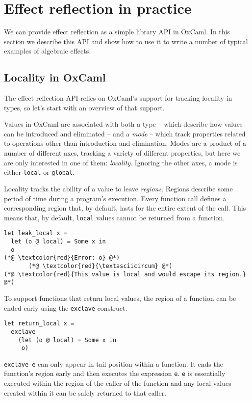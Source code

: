 \documentclass[acmsmall, screen, nonacm]{acmart}
\theoremstyle{definition}
\begin{document}
\section{Effect reflection in practice}
\label{sec:practice}

We can provide effect reflection as a simple library API in OxCaml. In
this section we describe this API and show how to use it to write a
number of typical examples of algebraic effects.

\subsection{Locality in OxCaml}

The effect reflection API relies on OxCaml's support for tracking
locality in types, so let's start with an overview of that support.

Values in OxCaml are associated with both a type -- which describe how
values can be introduced and eliminated -- and a \emph{mode} -- which
track properties related to operations other than introduction and
elimination. Modes are a product of a number of different axes, tracking
a variety of different properties, but here we are only interested in
one of them: \emph{locality}. Ignoring the other axes, a mode is either
\lstinline[style=oxcaml]{local} or \lstinline[style=oxcaml]{global}.

Locality tracks the ability of a value to leave \emph{regions}.  Regions
describe some period of time during a program's execution. Every
function call defines a corresponding region that, by default, lasts for
the entire extent of the call. This means that, by default,
\lstinline[style=oxcaml]{local} values cannot be returned from a
function.
\begin{lstlisting}[style=oxcaml]
let leak_local x =
  let (o @ local) = Some x in
  o
(*@ \textcolor{red}{Error: o} @*)
       (*@ \textcolor{red}{\textasciicircum} @*)
(*@ \textcolor{red}{This value is local and would escape its region.} @*)
\end{lstlisting}

To support functions that return local values, the region of a function
can be ended early using the \lstinline[style=oxcaml]{exclave} construct.
\begin{lstlisting}[style=oxcaml]
let return_local x =
  exclave
    (let (o @ local) = Some x in
     o)
\end{lstlisting}
\lstinline[style=oxcaml]{exclave e} can only appear in tail position
within a function.  It ends the function's region early and then
executes the expression
\lstinline[style=oxcaml]{e}. \lstinline[style=oxcaml]{e} is essentially
executed within the region of the caller of the function and any local
values created within it can be safely returned to that caller.
\end{document}
